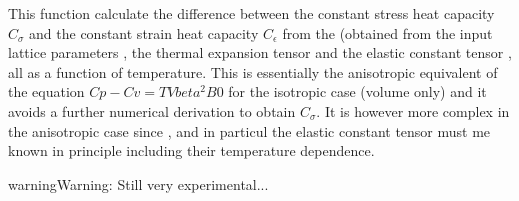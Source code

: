 \documentclass[letterpaper,10pt,english]{sphinxmanual}
\begin{document}
\begin{fulllineitems}
\label{pyqha:pyqha.properties_anis.compute_Csigma_from_alphaandC}
This function calculate the difference between the constant stress heat capacity
\(C_{\sigma}\) and the constant strain heat capacity \(C_{\epsilon}\) 
from the  (obtained from the input lattice parameters , the thermal
expansion tensor  and the elastic constant tensor , all as a function
of temperature. This is essentially the anisotropic equivalent of the equation
\(Cp - Cv = T V beta^2 B0\) for the isotropic case (volume only)
and it avoids a further numerical derivation to obtain \(C_{\sigma}\). 
It is however more complex in the anisotropic case since ,  and
in particul the elastic constant tensor  must me known in principle 
including their temperature dependence.

\begin{sphinxadmonition}{warning}{Warning:}
Still very experimental...
\end{sphinxadmonition}

\end{fulllineitems}

\end{document}
